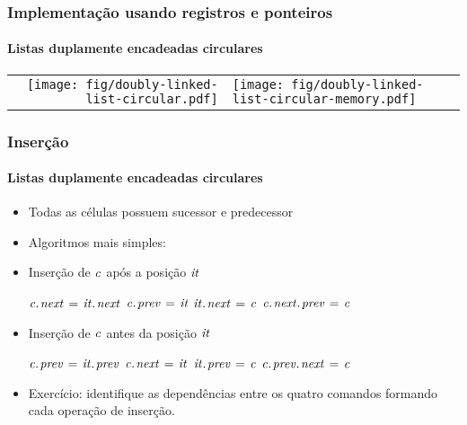 \documentclass{beamer}
\begin{document}
\begin{frame}
  \frametitle{Implementação usando registros e ponteiros}
  \framesubtitle{Listas duplamente encadeadas circulares}

  \begin{center}
    \begin{tabular}{rl}
    \texttt{[image: fig/doubly-linked-list-circular.pdf]}
    &
    \texttt{[image: fig/doubly-linked-list-circular-memory.pdf]}
    \end{tabular}
  \end{center}

\end{frame}

\begin{frame}
  \frametitle{Inserção}
  \framesubtitle{Listas duplamente encadeadas circulares}

  \begin{itemize}
    \item Todas as células possuem sucessor e predecessor
    \item Algoritmos mais simples:
    \item Inserção de $\id{c}$ após a posição $\id{it}$
      \begin{codebox}
        \zi $\attrib{\id{c}}{next} \gets \attrib{\id{it}}{next}$
        \zi $\attrib{\id{c}}{prev} \gets \id{it}$
        \zi $\attrib{\id{it}}{next} \gets \id{c}$
        \zi $\attrib{\attrib{\id{c}}{next}}{prev} \gets \id{c}$
      \end{codebox}
    \item Inserção de $\id{c}$ antes da posição $\id{it}$
      \begin{codebox}
        \zi $\attrib{\id{c}}{prev} \gets \attrib{\id{it}}{prev}$
        \zi $\attrib{\id{c}}{next} \gets \id{it}$
        \zi $\attrib{\id{it}}{prev} \gets \id{c}$
        \zi $\attrib{\attrib{\id{c}}{prev}}{next} \gets \id{c}$
      \end{codebox}
      \pause
    \item Exercício: identifique as dependências entre os quatro comandos formando cada operação de inserção.
  \end{itemize}
  
\end{frame}
\end{document}
